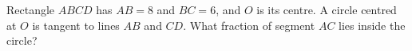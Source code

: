 Rectangle $ABCD$ has $AB=8$ and $BC=6$, and $O$ is its centre. A circle centred at $O$ is tangent to lines $AB$ and $CD$. What fraction of segment $AC$ lies inside the circle?
